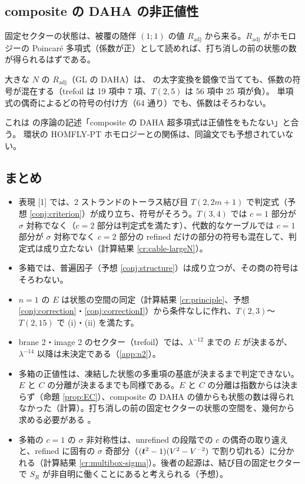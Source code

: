\subsection{composite の DAHA の非正値性}\label{sec:composite}
固定セクターの状態は、被覆の随伴 $(1;1)$ の値 $R_{\mathrm{adj}}$ から来る。$R_{\mathrm{adj}}$ がホモロジーの Poincaré 多項式（係数が正）として読めれば、打ち消しの前の状態の数が得られるはずである。
\begin{compresult}
大きな $N$ の $R_{\mathrm{adj}}$（GL の DAHA）は、\cite{KN17} の太字変換を鏡像で当てても、係数の符号が混在する（trefoil は 19 項中 7 項、$T(2,5)$ は 56 項中 25 項が負）。
単項式の偶奇によるどの符号の付け方（64 通り）でも、係数はそろわない。
\end{compresult}
これは \cite{CE15} の序論の記述「composite の DAHA 超多項式は正値性をもたない」と合う。
環状の HOMFLY-PT ホモロジーとの関係は、同論文でも予想されていない。

\subsection{まとめ}\label{sec:multibox-summary}
\begin{itemize}
\item 表現 [1] では、2 ストランドのトーラス結び目 $T(2,2m+1)$ で判定式（予想 \ref{conj:criterion}）が成り立ち、符号がそろう。$T(3,4)$ では $c = 1$ 部分が $\sigma$ 対称でなく（$c = 2$ 部分は判定式を満たす）、代数的なケーブルでは $c = 1$ 部分が $\sigma$ 対称でなく $c = 2$ 部分の refined だけの部分の符号も混在して、判定式は成り立たない（計算結果 \ref{cr:cable-largeN}）。
\item 多箱では、普遍因子（予想 \ref{conj:structure}）は成り立つが、その商の符号はそろわない。
\item $n = 1$ の $E$ は状態の空間の同定（計算結果 \ref{cr:principle}、予想 \ref{conj:correction}・\ref{conj:correctionI}）から条件なしに作れ、$T(2,3)$〜$T(2,15)$ で (i)・(ii) を満たす。
\item brane 2・image 2 のセクター（trefoil）では、$\lambda^{-12}$ までの $E$ が決まるが、$\lambda^{-14}$ 以降は未決定である（\ref{app:n2}）。
\item 多箱の正値性は、凍結した状態の多重項の基底が決まるまで判定できない。$E$ と $C$ の分離が決まるまでも同様である。$E$ と $C$ の分離は指数からは決まらず（命題 \ref{prop:EC}）、composite の DAHA の値からも状態の数は得られなかった（計算）。打ち消しの前の固定セクターの状態の空間を、幾何から求める必要がある \open。
\item 多箱の $c = 1$ の $\sigma$ 非対称性は、unrefined の段階での $c$ の偶奇の取り違えと、refined に固有の $\sigma$ 奇部分（$(\bm{t}^2-1)(V^2-V^{-2})$ で割り切れる）に分かれる（計算結果 \ref{cr:multibox-sigma}）。後者の起源は、結び目の固定セクターで $S_R$ が非自明に働くことにあると考えられる（予想）。
\end{itemize}
